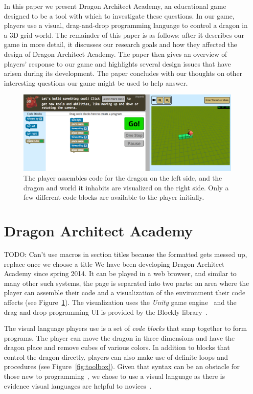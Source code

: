 \documentclass{sig-alternate}
\newcommand{\TODO}[1]{{\color{red} TODO: #1}}
\newcommand{\gametitle}{{\color{RoyalPurple} Dragon Architect Academy}}
\begin{document}
In this paper we present \gametitle{}, an educational game designed to be a tool with which to investigate these questions. 
In our game, players use a visual, drag-and-drop programming language to control a dragon in a 3D grid world. 
The remainder of this paper is as follows: after it describes our game in more detail, it discusses our research goals and how they affected the design of \gametitle{}. 
The paper then gives an overview of players' response to our game and highlights several design issues that have arisen during its development.
The paper concludes with our thoughts on other interesting questions our game might be used to help answer.

\begin{figure}[t!]
  \centering
  \includegraphics[width=\textwidth]{images/overall-example}
  \caption{The player assembles code for the dragon on the left side, and the dragon and world it inhabits are visualized on the right side. Only a few different code blocks are available to the player initially.}
  \label{fig:overall}
\end{figure}

\section{\gametitle{}}
\TODO{Can't use macros in section titles because the formatted gets messed up, replace once we choose a title} 
We have been developing \gametitle{} since spring 2014. 
It can be played in a web browser, and similar to many other such systems, the page is separated into two parts: an area where the player can assemble their code and a visualization of the environment their code affects (see Figure~\ref{fig:overall}). 
The visualization uses the \emph{Unity} game engine~\cite{unity} and the drag-and-drop programming UI is provided by the Blockly library~\cite{blockly}.

The visual language players use is a set of \emph{code blocks} that snap together to form programs. 
The player can move the dragon in three dimensions and have the dragon place and remove cubes of various colors. 
In addition to blocks that control the dragon directly, players can also make use of definite loops and procedures (see Figure~\ref{fig:toolbox}).
Given that syntax can be an obstacle for those new to programming~\cite{stefik2013syntax}, we chose to use a visual language as there is evidence visual languages are helpful to novices~\cite{whitley1997visual}.
\end{document}
